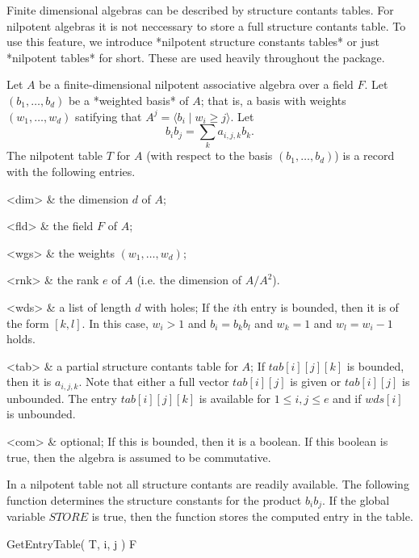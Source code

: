 

Finite dimensional algebras can be described by structure contants tables.
For nilpotent algebras it is not neccessary to store a full structure 
contants table. To use this feature, we introduce *nilpotent structure
constants tables* or just *nilpotent tables* for short. These are used 
heavily throughout the package.


Let $A$ be a finite-dimensional nilpotent associative algebra over a 
field $F$. Let $(b_1, \ldots, b_d)$ be a *weighted basis* of $A$; that
is, a basis with weights $(w_1, \ldots, w_d)$ satifying that $A^j = 
\langle b_i \mid w_i \geq j \rangle$. Let
$$ b_i b_j = \sum_k a_{i,j,k} b_k.$$
The nilpotent table $T$ for $A$ (with respect to the basis $(b_1,
\ldots, b_d)$) is a record with the following entries.

\beginitems
<dim> & 
   the dimension $d$ of $A$;

<fld> & 
   the field $F$ of $A$;

<wgs> & 
   the weights $(w_1, \ldots, w_d)$;

<rnk> &
   the rank $e$ of $A$ (i.e. the dimension of $A/A^2$).

<wds> & 
   a list of length $d$ with holes; If the $i$th entry is bounded, then 
   it is of the form $[k,l]$. In this case, $w_i > 1$ and $b_i = b_k b_l$ 
   and $w_k = 1$ and $w_l = w_i-1$ holds.
  
<tab> &
   a partial structure contants table for $A$; If $tab[i][j][k]$ is bounded,
   then it is $a_{i,j,k}$. Note that either a full vector $tab[i][j]$ is
   given or $tab[i][j]$ is unbounded. The entry $tab[i][j][k]$ is available
   for $1 \leq i,j \leq e$ and if $wds[i]$ is unbounded. 

<com> &
   optional; If this is bounded, then it is a boolean. If this boolean
   is true, then the algebra is assumed to be commutative.

\enditems

In a nilpotent table not all structure contants are readily available.
The following function determines the structure constants for the
product $b_i b_j$. If the global variable $STORE$ is true, then the
function stores the computed entry in the table.

\> GetEntryTable( T, i, j ) F

